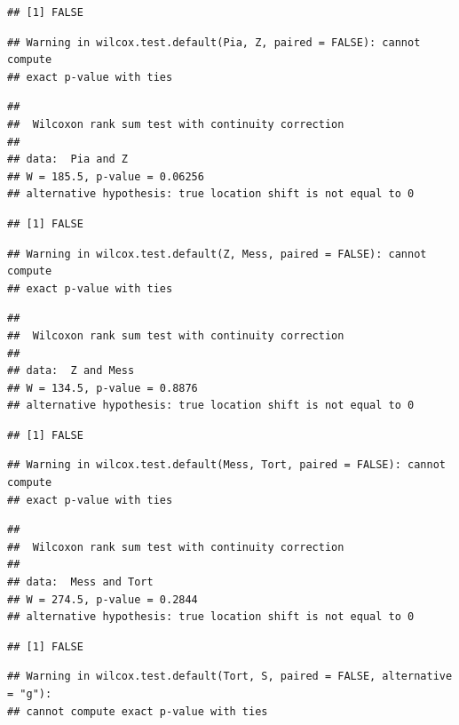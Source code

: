 \documentclass[]{article}
\begin{document}
\begin{verbatim}
## [1] FALSE
\end{verbatim}

\begin{verbatim}
## Warning in wilcox.test.default(Pia, Z, paired = FALSE): cannot compute
## exact p-value with ties
\end{verbatim}

\begin{verbatim}
## 
##  Wilcoxon rank sum test with continuity correction
## 
## data:  Pia and Z
## W = 185.5, p-value = 0.06256
## alternative hypothesis: true location shift is not equal to 0
\end{verbatim}

\begin{verbatim}
## [1] FALSE
\end{verbatim}

\begin{verbatim}
## Warning in wilcox.test.default(Z, Mess, paired = FALSE): cannot compute
## exact p-value with ties
\end{verbatim}

\begin{verbatim}
## 
##  Wilcoxon rank sum test with continuity correction
## 
## data:  Z and Mess
## W = 134.5, p-value = 0.8876
## alternative hypothesis: true location shift is not equal to 0
\end{verbatim}

\begin{verbatim}
## [1] FALSE
\end{verbatim}

\begin{verbatim}
## Warning in wilcox.test.default(Mess, Tort, paired = FALSE): cannot compute
## exact p-value with ties
\end{verbatim}

\begin{verbatim}
## 
##  Wilcoxon rank sum test with continuity correction
## 
## data:  Mess and Tort
## W = 274.5, p-value = 0.2844
## alternative hypothesis: true location shift is not equal to 0
\end{verbatim}

\begin{verbatim}
## [1] FALSE
\end{verbatim}

\begin{verbatim}
## Warning in wilcox.test.default(Tort, S, paired = FALSE, alternative = "g"):
## cannot compute exact p-value with ties
\end{verbatim}
\end{document}
